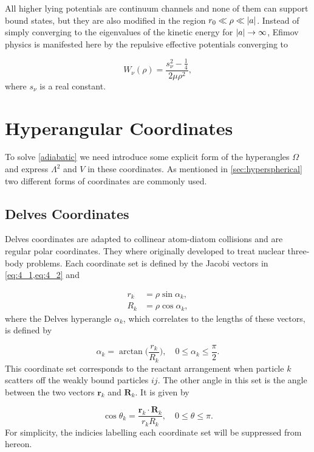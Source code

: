 All higher lying potentials are continuum channels and none of them can support bound states, but they are also modified in the region $r_0 \ll \rho \ll \lvert a\rvert$. Instead of simply converging to the eigenvalues of the kinetic energy for $\lvert a\rvert \rightarrow \infty$, Efimov physics is manifested here by the repulsive effective potentials converging to 

\begin{equation}
W_{\nu}(\rho) = \frac{s_{\nu}^2-\frac{1}{4}}{2\mu \rho^2},
\end{equation} 
where $s_{\nu}$ is a real constant. 
 
\section{Hyperangular Coordinates}
To solve \eqref{adiabatic} we need introduce some explicit form of the hyperangles $\Omega$ and express $\Lambda^2$ and $V$ in these coordinates. As mentioned in \cref{sec:hyperspherical} two different forms of coordinates are commonly used.

\subsection{Delves Coordinates}\label{delvescoord}
Delves coordinates are adapted to collinear atom-diatom collisions and are regular polar coordinates. They where originally developed to treat nuclear three-body problems. Each coordinate set is defined by the Jacobi vectors in \cref{eq:4_1,eq:4_2} and 

\begin{align}
r_{k} &= \rho \sin{\alpha_{k}},\\
R_{k} &= \rho \cos{\alpha_{k}},
\end{align}
where the Delves hyperangle $\alpha_{k}$, which correlates to the lengths of these vectors, is defined by

\begin{equation}
\alpha_{k} = \arctan\bigg(\frac{r_{k}}{R_{k}}\bigg), \quad 0\leq \alpha_{k} \leq \frac{\pi}{2}.
\end{equation}
This coordinate set corresponds to the reactant arrangement when particle $k$ scatters off the weakly bound particles $ij$. The other angle in this set is the angle between the two vectors $\mathbf{r}_{k}$ and $\mathbf{R}_{k}$. It is given by

\begin{equation}
\cos{\theta_{k}} = \frac{\mathbf{r}_{k} \cdot \mathbf{R}_{k}}{r_{k} R_{k}}, \quad  0\leq \theta \leq \pi.
\end{equation}
For simplicity, the indicies labelling each coordinate set will be suppressed from hereon. 

